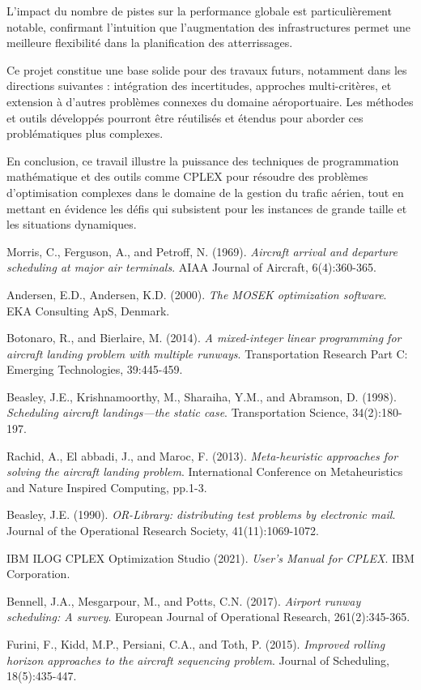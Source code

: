 \documentclass[a4paper,12pt]{report}
\begin{document}
L'impact du nombre de pistes sur la performance globale est particulièrement notable, confirmant l'intuition que l'augmentation des infrastructures permet une meilleure flexibilité dans la planification des atterrissages.

Ce projet constitue une base solide pour des travaux futurs, notamment dans les directions suivantes : intégration des incertitudes, approches multi-critères, et extension à d'autres problèmes connexes du domaine aéroportuaire. Les méthodes et outils développés pourront être réutilisés et étendus pour aborder ces problématiques plus complexes.

En conclusion, ce travail illustre la puissance des techniques de programmation mathématique et des outils comme CPLEX pour résoudre des problèmes d'optimisation complexes dans le domaine de la gestion du trafic aérien, tout en mettant en évidence les défis qui subsistent pour les instances de grande taille et les situations dynamiques.


\begin{thebibliography}{9}

Morris, C., Ferguson, A., and Petroff, N. (1969).
\textit{Aircraft arrival and departure scheduling at major air terminals}.
AIAA Journal of Aircraft, 6(4):360-365.

Andersen, E.D., Andersen, K.D. (2000).
\textit{The MOSEK optimization software}.
EKA Consulting ApS, Denmark.

Botonaro, R., and Bierlaire, M. (2014).
\textit{A mixed-integer linear programming for aircraft landing problem with multiple runways}.
Transportation Research Part C: Emerging Technologies, 39:445-459.

Beasley, J.E., Krishnamoorthy, M., Sharaiha, Y.M., and Abramson, D. (1998).
\textit{Scheduling aircraft landings—the static case}.
Transportation Science, 34(2):180-197.

Rachid, A., El abbadi, J., and Maroc, F. (2013).
\textit{Meta-heuristic approaches for solving the aircraft landing problem}.
International Conference on Metaheuristics and Nature Inspired Computing, pp.1-3.

Beasley, J.E. (1990).
\textit{OR-Library: distributing test problems by electronic mail}.
Journal of the Operational Research Society, 41(11):1069-1072.

IBM ILOG CPLEX Optimization Studio (2021).
\textit{User's Manual for CPLEX}.
IBM Corporation.

Bennell, J.A., Mesgarpour, M., and Potts, C.N. (2017).
\textit{Airport runway scheduling: A survey}.
European Journal of Operational Research, 261(2):345-365.

Furini, F., Kidd, M.P., Persiani, C.A., and Toth, P. (2015).
\textit{Improved rolling horizon approaches to the aircraft sequencing problem}.
Journal of Scheduling, 18(5):435-447.

\end{thebibliography}
\end{document}
